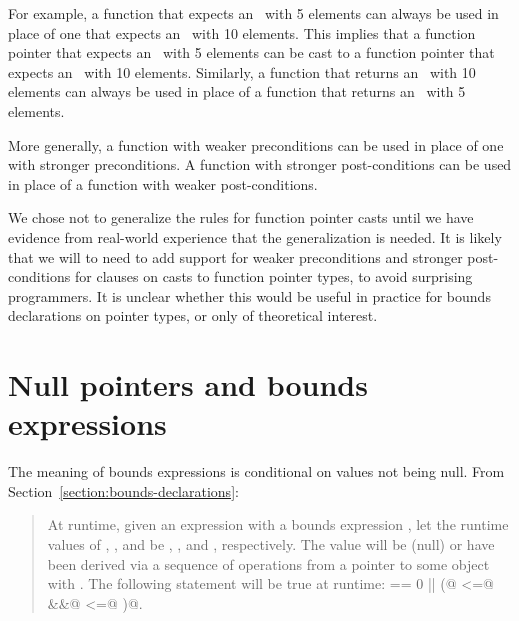 For example, a function that expects an \arrayptr\ with 5 elements can
always be used in place of one that expects an \arrayptr\ with 10 elements.
This implies that a function pointer that expects an \arrayptr\ with 5
elements can be cast to a function pointer that expects an \arrayptr\ with
10 elements.  Similarly, a function that returns an \arrayptr\ with 10 elements
can always be used in place of a function that returns an \arrayptr\ with 5
elements.

More generally, a function with weaker preconditions can be used in place
of one with stronger preconditions.  A function with stronger post-conditions
can be used in place of a function with weaker post-conditions.

We chose not to generalize the rules for function pointer casts until we have
evidence from real-world experience that the generalization is needed.   It is
likely that we will to need to add support for weaker preconditions and stronger
post-conditions for  clauses on casts to function pointer types,
to avoid surprising programmers.  It is unclear whether this would be useful in
practice for bounds declarations on pointer types, or only of theoretical
interest.

\section{Null pointers and bounds expressions}

\newcommand{\objectbounds}[2]{\lstinline|object_bounds(|#1\lstinline|,| #2 \lstinline|)|}

The meaning of bounds expressions is conditional on values not being null. 
From Section~\ref{section:bounds-declarations}:
\begin{quote}
At runtime, given an expression  with a bounds expression
, let the runtime
values of , , and  be , ,
and , respectively. The value  will be  (null) or
have been derived via a sequence of operations from a pointer to some
object  with .
The following statement will be true at runtime:
 \lstinline@== 0 || (@ \lstinline@<=@  \lstinline@&&@
 \lstinline@<=@ \lstinline@)@. 
\end{quote}

